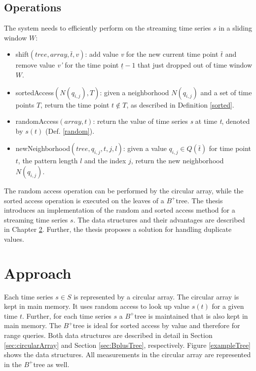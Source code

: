 \documentclass[abstracton,12pt,oneside]{scrreprt}
\begin{document}
\section{Operations}
\label{sec:Op}
The system needs to efficiently perform on the streaming time series $s$ in a sliding window $W$: 
\begin{itemize}  
	\item shift$(tree,array,\bar{t}, v)$: add value \emph{v} for the new current time point $\bar{t}$ and remove value \emph{v'} for the time point $\underline{t} - 1$ that just dropped out of time window $W$.
	\item sortedAccess$(N(q_{i,j}),T)$: given a neighborhood $N(q_{i,j})$ and a set of time points $T$, return the time point $t \not\in T$, as described in Definition \ref{sorted}.
	\item randomAccess$(array, t)$: return the value of time series \emph{s} at time \emph{t}, denoted by $s(t)$ (Def. \ref{random}).
	\item newNeighborhood$(tree,q_{i,j},t,j,l)$: given a value $q_{i,j} \in Q(\bar{t})$ for time point $t$, the pattern length $l$ and the index $j$, return the new neighborhood $N(q_{i,j})$.
\end{itemize}
The random access operation can be performed by the circular array, while the sorted access operation is executed on the leaves of a $B^+$tree. The thesis introduces an implementation of the random and sorted access method for a streaming time series $s$. The data structures and their advantages are described in Chapter \ref{sec:Approach}. Further, the thesis proposes a solution for handling duplicate values. 



\chapter{Approach}
\label{sec:Approach}
Each time series $s \in S$ is represented by a circular array. The circular array is kept in main memory. It uses random access to look up value $s(t)$ for a given time $t$. Further, for each time series $s$ a $B^+$tree is maintained that is also kept in main memory. The $B^+$tree is ideal for sorted access by value and therefore for range queries. Both data structures are described in detail in Section \ref{sec:circularArray} and Section \ref{sec:BplusTree}, respectively. Figure \ref{exampleTree} shows the data structures. All measurements in the circular array are represented in the $B^+$tree as well.
\end{document}
